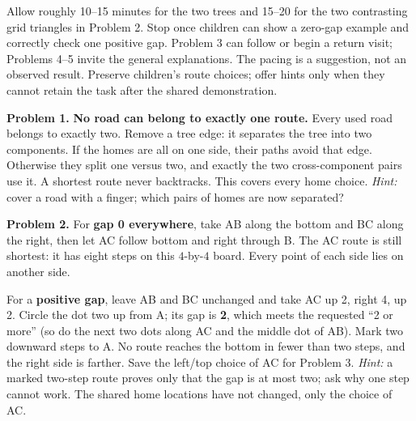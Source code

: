 \documentclass[11pt,letterpaper]{article}
\newcommand{\heading}[1]{\par\vspace{5pt}{\large\bfseries #1}\par}
\begin{document}
\heading{A feasible first visit}
Allow roughly 10--15 minutes for the two trees and 15--20 for the two contrasting grid triangles in Problem 2. Stop once children can show a zero-gap example and correctly check one positive gap. Problem 3 can follow or begin a return visit; Problems 4--5 invite the general explanations. The pacing is a suggestion, not an observed result. Preserve children's route choices; offer hints only when they cannot retain the task after the shared demonstration.
\heading{Numbered answers and proof prompts}
\textbf{Problem 1.} \textbf{No road can belong to exactly one route.} Every used road belongs to exactly two. Remove a tree edge: it separates the tree into two components. If the homes are all on one side, their paths avoid that edge. Otherwise they split one versus two, and exactly the two cross-component pairs use it. A shortest route never backtracks. This covers every home choice. \emph{Hint:} cover a road with a finger; which pairs of homes are now separated?

\textbf{Problem 2.} For \textbf{gap 0 everywhere}, take AB along the bottom and BC along the right, then let AC follow bottom and right through B. The AC route is still shortest: it has eight steps on this $4$-by-$4$ board. Every point of each side lies on another side.

For a \textbf{positive gap}, leave AB and BC unchanged and take AC up 2, right 4, up 2. Circle the dot two up from A; its gap is \textbf{2}, which meets the requested ``2 or more'' (so do the next two dots along AC and the middle dot of AB). Mark two downward steps to A. No route reaches the bottom in fewer than two steps, and the right side is farther. Save the left/top choice of AC for Problem 3. \emph{Hint:} a marked two-step route proves only that the gap is at most two; ask why one step cannot work. The shared home locations have not changed, only the choice of AC.
\end{document}
